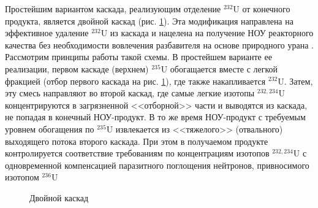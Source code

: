 Простейшим вариантом каскада, реализующим отделение $^{232}$U от конечного продукта, является двойной каскад (рис. \ref{fig:double_ru}).
Эта модификация направлена на эффективное удаление $^{232}$U из каскада и нацелена на получение НОУ реакторного качества без необходимости вовлечения разбавителя на основе природного урана \cite{SosninYuChelcov, TehnicheskieResheniyaPo}.
Рассмотрим принципы работы такой схемы.
В простейшем варианте ее реализации, первом каскаде (верхнем) $^{235}$U обогащается вместе с легкой фракцией (отбор первого каскада на рис. \ref{fig:double_ru}), где также накапливается $^{232}$U.
Затем, эту смесь направляют во второй каскад, где самые легкие изотопы $^{232,234}$U концентрируются в загрязненной <<отборной>> части и выводятся из каскада, не попадая в конечный НОУ-продукт.
В то же время НОУ-продукт с требуемым уровнем обогащения по $^{235}$U извлекается из <<тяжелого>> (отвального) выходящего потока второго каскада. При этом в получаемом продукте контролируется соответствие требованиям по концентрациям изотопов $^{232,234}$U с одновременной компенсацией паразитного поглощения нейтронов, привносимого изотопом $^{236}$U
\begin{figure}[ht]
  \caption{Двойной каскад}\label{fig:double_ru}
\end{figure}

